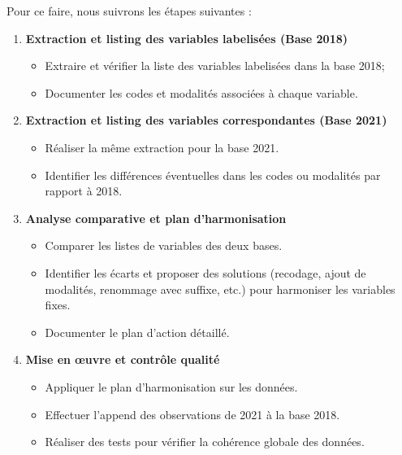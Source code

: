 \documentclass[
]{article}
\providecommand{\tightlist}{%
  \setlength{\itemsep}{0pt}\setlength{\parskip}{0pt}}
\begin{document}
Pour ce faire, nous suivrons les étapes suivantes :

\begin{enumerate}
\def\labelenumi{\arabic{enumi}.}
\tightlist
\item
  \textbf{Extraction et listing des variables labelisées (Base 2018)}

  \begin{itemize}
  \tightlist
  \item
    Extraire et vérifier la liste des variables labelisées dans la base
    2018;\\
  \item
    Documenter les codes et modalités associées à chaque variable.
  \end{itemize}
\item
  \textbf{Extraction et listing des variables correspondantes (Base
  2021)}

  \begin{itemize}
  \tightlist
  \item
    Réaliser la même extraction pour la base 2021.\\
  \item
    Identifier les différences éventuelles dans les codes ou modalités
    par rapport à 2018.
  \end{itemize}
\item
  \textbf{Analyse comparative et plan d'harmonisation}

  \begin{itemize}
  \tightlist
  \item
    Comparer les listes de variables des deux bases.\\
  \item
    Identifier les écarts et proposer des solutions (recodage, ajout de
    modalités, renommage avec suffixe, etc.) pour harmoniser les
    variables fixes.\\
  \item
    Documenter le plan d'action détaillé.
  \end{itemize}
\item
  \textbf{Mise en œuvre et contrôle qualité}

  \begin{itemize}
  \tightlist
  \item
    Appliquer le plan d'harmonisation sur les données.\\
  \item
    Effectuer l'append des observations de 2021 à la base 2018.\\
  \item
    Réaliser des tests pour vérifier la cohérence globale des données.
  \end{itemize}
\end{enumerate}
\end{document}
